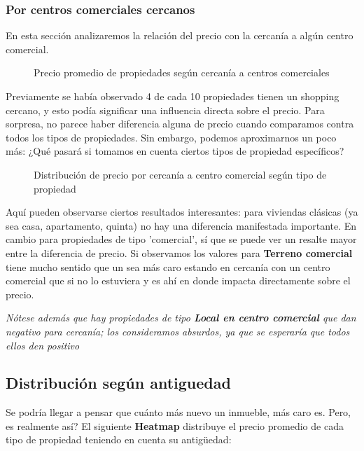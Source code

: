 \documentclass[
10pt, %
a4paper, %
oneside, %
headinclude,footinclude, %
BCOR5mm, %
]{scrartcl}
\begin{document}
    \subsubsection{Por centros comerciales cercanos}
        En esta sección analizaremos la relación del precio con la cercanía a algún centro comercial. 
        
        \begin{figure}[H]
         \caption{Precio promedio de propiedades según cercanía a centros comerciales}
         \label{fig:precio-escuelas-cercanas-todas-prop}
    \end{figure}
     
    Previamente se había observado 4 de cada 10 propiedades tienen un shopping cercano, y esto podía significar una influencia directa sobre el precio. Para sorpresa, no parece haber diferencia alguna de precio cuando comparamos contra todos los tipos de propiedades. Sin embargo, podemos aproximarnos un poco más: ¿Qué pasará si tomamos en cuenta ciertos tipos de propiedad específicos? 
    \begin{figure}[H]
         \caption{Distribución de precio por cercanía a centro comercial según tipo de propiedad}
         \label{fig:precio-ccomerciales-cercanas-por-prop}
    \end{figure}
    
    Aquí pueden observarse ciertos resultados interesantes: para viviendas clásicas (ya sea casa, apartamento, quinta) no hay una diferencia manifestada importante. En cambio para propiedades de tipo 'comercial', sí que se puede ver un resalte mayor entre la diferencia de precio. 
    Si observamos los valores para \textbf{Terreno comercial} tiene mucho sentido que un sea más caro estando en cercanía con un centro comercial que si no lo estuviera y es ahí en donde impacta directamente sobre el precio.
    
    \textit{Nótese además que hay propiedades de tipo \textbf{Local en centro comercial} que dan negativo para cercanía; los consideramos absurdos, ya que se esperaría que todos ellos den positivo}
    
\newpage 
\subsection{Distribución según antiguedad}
    Se podría llegar a pensar que cuánto más nuevo un inmueble, más caro es. Pero, es realmente así? El siguiente \textbf{Heatmap} distribuye el precio promedio de cada tipo de propiedad teniendo en cuenta su antigüedad:
    
\end{document}
